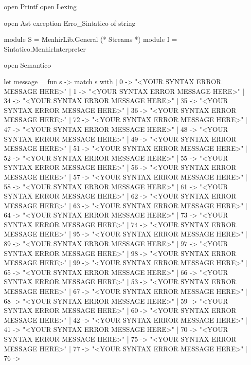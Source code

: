 \documentclass[12pt,a4paper,twoside]{article}
\begin{document}
\begin{terminal}
open Printf
open Lexing

open Ast
exception Erro_Sintatico of string

module S = MenhirLib.General (* Streams *)
module I = Sintatico.MenhirInterpreter

open Semantico

let message =
  fun s ->
    match s with
    | 0 ->
        "<YOUR SYNTAX ERROR MESSAGE HERE>\n"
    | 1 ->
        "<YOUR SYNTAX ERROR MESSAGE HERE>\n"
    | 34 ->
        "<YOUR SYNTAX ERROR MESSAGE HERE>\n"
    | 35 ->
        "<YOUR SYNTAX ERROR MESSAGE HERE>\n"
    | 36 ->
        "<YOUR SYNTAX ERROR MESSAGE HERE>\n"
    | 72 ->
        "<YOUR SYNTAX ERROR MESSAGE HERE>\n"
    | 47 ->
        "<YOUR SYNTAX ERROR MESSAGE HERE>\n"
    | 48 ->
        "<YOUR SYNTAX ERROR MESSAGE HERE>\n"
    | 49 ->
        "<YOUR SYNTAX ERROR MESSAGE HERE>\n"
    | 51 ->
        "<YOUR SYNTAX ERROR MESSAGE HERE>\n"
    | 52 ->
        "<YOUR SYNTAX ERROR MESSAGE HERE>\n"
    | 55 ->
        "<YOUR SYNTAX ERROR MESSAGE HERE>\n"
    | 56 ->
        "<YOUR SYNTAX ERROR MESSAGE HERE>\n"
    | 57 ->
        "<YOUR SYNTAX ERROR MESSAGE HERE>\n"
    | 58 ->
        "<YOUR SYNTAX ERROR MESSAGE HERE>\n"
    | 61 ->
        "<YOUR SYNTAX ERROR MESSAGE HERE>\n"
    | 62 ->
        "<YOUR SYNTAX ERROR MESSAGE HERE>\n"
    | 63 ->
        "<YOUR SYNTAX ERROR MESSAGE HERE>\n"
    | 64 ->
        "<YOUR SYNTAX ERROR MESSAGE HERE>\n"
    | 73 ->
        "<YOUR SYNTAX ERROR MESSAGE HERE>\n"
    | 74 ->
        "<YOUR SYNTAX ERROR MESSAGE HERE>\n"
    | 95 ->
        "<YOUR SYNTAX ERROR MESSAGE HERE>\n"
    | 89 ->
        "<YOUR SYNTAX ERROR MESSAGE HERE>\n"
    | 97 ->
        "<YOUR SYNTAX ERROR MESSAGE HERE>\n"
    | 98 ->
        "<YOUR SYNTAX ERROR MESSAGE HERE>\n"
    | 99 ->
        "<YOUR SYNTAX ERROR MESSAGE HERE>\n"
    | 65 ->
        "<YOUR SYNTAX ERROR MESSAGE HERE>\n"
    | 66 ->
        "<YOUR SYNTAX ERROR MESSAGE HERE>\n"
    | 53 ->
        "<YOUR SYNTAX ERROR MESSAGE HERE>\n"
    | 67 ->
        "<YOUR SYNTAX ERROR MESSAGE HERE>\n"
    | 68 ->
        "<YOUR SYNTAX ERROR MESSAGE HERE>\n"
    | 59 ->
        "<YOUR SYNTAX ERROR MESSAGE HERE>\n"
    | 60 ->
        "<YOUR SYNTAX ERROR MESSAGE HERE>\n"
    | 42 ->
        "<YOUR SYNTAX ERROR MESSAGE HERE>\n"
    | 41 ->
        "<YOUR SYNTAX ERROR MESSAGE HERE>\n"
    | 70 ->
        "<YOUR SYNTAX ERROR MESSAGE HERE>\n"
    | 75 ->
        "<YOUR SYNTAX ERROR MESSAGE HERE>\n"
    | 77 ->
        "<YOUR SYNTAX ERROR MESSAGE HERE>\n"
    | 76 ->

\end{terminal}
\end{document}
